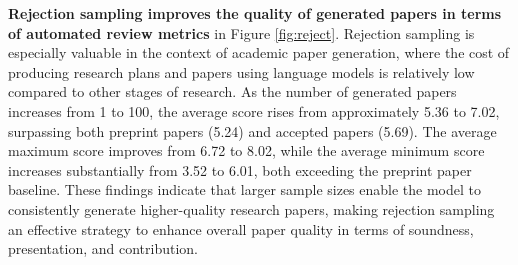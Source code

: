\documentclass{article} %
\begin{document}
\begin{table}
\centering
\vspace{-0.7cm}
\caption{Ablation study of different variations of CycleResearcher-12B.}
\vspace{0.1cm}
\renewcommand{\arraystretch}{1}
\setlength{\tabcolsep}{6pt}


\label{tab:score_res_mod}
\end{table}

\textbf{Rejection sampling improves the quality of generated papers in terms of automated review metrics} in Figure \ref{fig:reject}. Rejection sampling is especially valuable in the context of academic paper generation, where the cost of producing research plans and papers using language models is relatively low compared to other stages of research. As the number of generated papers increases from 1 to 100, the average score rises from approximately 5.36 to 7.02, surpassing both preprint papers (5.24) and accepted papers (5.69). The average maximum score improves from 6.72 to 8.02, while the average minimum score increases substantially from 3.52 to 6.01, both exceeding the preprint paper baseline. These findings indicate that larger sample sizes enable the model to consistently generate higher-quality research papers, making rejection sampling an effective strategy to enhance overall paper quality in terms of soundness, presentation, and contribution. 
\end{document}
